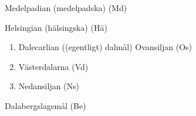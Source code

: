 Medelpadian (medelpadska) (Md)  


Helsingian (hälsingska) (Hä)  


\begin{enumerate} %
\item 
Dalecarlian ((egentligt) dalmål)  Ovansiljan (Os)

\item 
Västerdalarna (Vd)

\item 
Nedansiljan (Ns)

\end{enumerate} %
Dalabergslagsmål (Be)  


